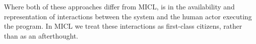\documentclass{sig-alternate-05-2015}
\begin{document}
Where both of these approaches differ from MICL, is in the availability and
representation of interactions between the system and the human actor
executing the program. In MICL we treat these interactions as first-class
citizens, rather than as an afterthought.





\end{document}
